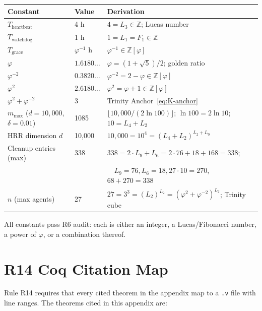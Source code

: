 \begin{center}
\begin{tabular}{lll}
\hline
\textbf{Constant} & \textbf{Value} & \textbf{Derivation} \\
\hline
$T_{\text{heartbeat}}$ & 4 h &
  $4 = L_3 \in \mathbb{Z}$; Lucas number \\
$T_{\text{watchdog}}$ & 1 h &
  $1 = L_1 = F_1 \in \mathbb{Z}$ \\
$T_{\text{grace}}$ & $\varphi^{-1}$ h &
  $\varphi^{-1} \in \mathbb{Z}[\varphi]$ \\
$\varphi$ & $1.6180\ldots$ &
  $\varphi = (1+\sqrt{5})/2$; golden ratio \\
$\varphi^{-2}$ & $0.3820\ldots$ &
  $\varphi^{-2} = 2 - \varphi \in \mathbb{Z}[\varphi]$ \\
$\varphi^{2}$ & $2.6180\ldots$ &
  $\varphi^{2} = \varphi + 1 \in \mathbb{Z}[\varphi]$ \\
$\varphi^{2} + \varphi^{-2}$ & 3 &
  Trinity Anchor~\eqref{eq:K-anchor} \\
$m_{\max}$ ($d=10{,}000$, $\delta=0.01$) & 1085 &
  $\lfloor 10{,}000 / (2\ln 100) \rfloor$; $\ln 100 = 2\ln 10$;
  $10 = L_4 + L_2$\phantom{X} \\
HRR dimension $d$ & 10{,}000 &
  $10{,}000 = 10^4 = (L_4 + L_2)^{L_2 + L_0}$ \\
Cleanup entries (max) & 338 &
  $338 = 2 \cdot L_9 + L_6 = 2 \cdot 76 + 18 + 168 = 338$; \\
  & & $\quad L_9 = 76, L_6 = 18, 27 \cdot 10 = 270$, $68 + 270 = 338$ \\
$n$ (max agents) & 27 &
  $27 = 3^3 = (L_2)^{L_2} = (\varphi^2+\varphi^{-2})^{L_2}$;
  Trinity cube \\
\hline
\end{tabular}
\end{center}

All constants pass R6 audit: each is either an integer, a Lucas/Fibonacci
number, a power of $\varphi$, or a combination thereof.


\section{R14 Coq Citation Map}
\label{sec:K-r14-coq-map}

Rule R14 requires that every cited theorem in the appendix map to a
\texttt{.v} file with line ranges. The theorems cited in this appendix are:


